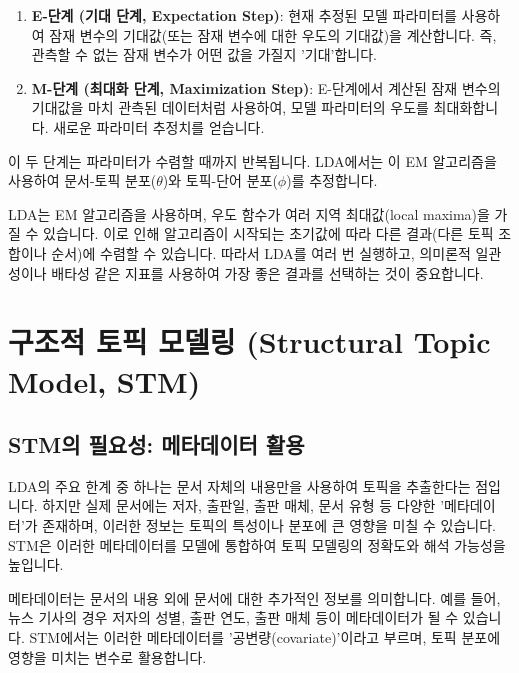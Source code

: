 \documentclass[11pt,a4paper]{article}
\theoremstyle{definition}
\begin{document}
\begin{enumerate}
    \item \textbf{E-단계 (기대 단계, Expectation Step)}: 현재 추정된 모델 파라미터를 사용하여 잠재 변수의 기대값(또는 잠재 변수에 대한 우도의 기대값)을 계산합니다. 즉, 관측할 수 없는 잠재 변수가 어떤 값을 가질지 '기대'합니다.
    \item \textbf{M-단계 (최대화 단계, Maximization Step)}: E-단계에서 계산된 잠재 변수의 기대값을 마치 관측된 데이터처럼 사용하여, 모델 파라미터의 우도를 최대화합니다. 새로운 파라미터 추정치를 얻습니다.
\end{enumerate}
이 두 단계는 파라미터가 수렴할 때까지 반복됩니다. LDA에서는 이 EM 알고리즘을 사용하여 문서-토픽 분포($\theta$)와 토픽-단어 분포($\phi$)를 추정합니다.

\begin{tcolorbox}[caution={LDA의 비고유한 해}]
LDA는 EM 알고리즘을 사용하며, 우도 함수가 여러 지역 최대값(local maxima)을 가질 수 있습니다. 이로 인해 알고리즘이 시작되는 초기값에 따라 다른 결과(다른 토픽 조합이나 순서)에 수렴할 수 있습니다. 따라서 LDA를 여러 번 실행하고, 의미론적 일관성이나 배타성 같은 지표를 사용하여 가장 좋은 결과를 선택하는 것이 중요합니다.
\end{tcolorbox}

\newpage
\section{구조적 토픽 모델링 (Structural Topic Model, STM)}

\subsection{STM의 필요성: 메타데이터 활용}
LDA의 주요 한계 중 하나는 문서 자체의 내용만을 사용하여 토픽을 추출한다는 점입니다. 하지만 실제 문서에는 저자, 출판일, 출판 매체, 문서 유형 등 다양한 '메타데이터'가 존재하며, 이러한 정보는 토픽의 특성이나 분포에 큰 영향을 미칠 수 있습니다. STM은 이러한 메타데이터를 모델에 통합하여 토픽 모델링의 정확도와 해석 가능성을 높입니다.

\begin{tcolorbox}[definition={메타데이터 (Metadata) 또는 공변량 (Covariate)}]
메타데이터는 문서의 내용 외에 문서에 대한 추가적인 정보를 의미합니다. 예를 들어, 뉴스 기사의 경우 저자의 성별, 출판 연도, 출판 매체 등이 메타데이터가 될 수 있습니다. STM에서는 이러한 메타데이터를 '공변량(covariate)'이라고 부르며, 토픽 분포에 영향을 미치는 변수로 활용합니다.
\end{tcolorbox}
\end{document}
